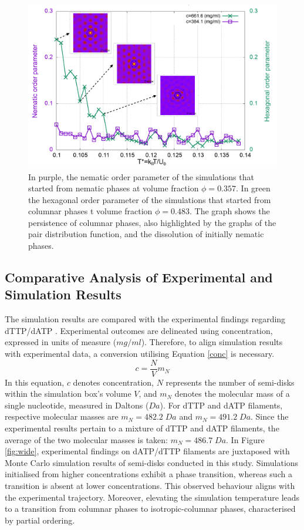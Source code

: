 \documentclass[aip,jcp, amsmath, amssymb, reprint]{revtex4-1}
\begin{document}
\begin{figure}[h!]
\includegraphics[width=0.99\linewidth]{par.png}
\caption{\label{fig:par} In purple, the nematic order parameter of the simulations that started from nematic phases at volume fraction $\phi=0.357$. In green the hexagonal order parameter of the simulations that started from columnar phases t volume fraction $\phi=0.483$. The graph shows the persistence of columnar phases, also highlighted by the graphs of the pair distribution function, and the dissolution of initially nematic phases.}
\end{figure}



\subsection{Comparative Analysis of Experimental and Simulation Results}


The simulation results are compared with the experimental findings regarding dTTP/dATP \cite{Smith}. Experimental outcomes are delineated using concentration, expressed in units of measure ($mg/ml$). Therefore, to align simulation results with experimental data, a conversion utilising Equation \ref{conc} is necessary. 
\begin{equation}
	c=\frac{N}{V}m_N
	\label{conc}
\end{equation}
In this equation, $c$ denotes concentration, $N$ represents the number of semi-disks within the simulation box's volume $V$, and $m_N$ denotes the molecular mass of a single nucleotide, measured in Daltons ($Da$). For dTTP and dATP filaments, respective molecular masses are $m_N=482.2\; Da$ and $m_N=491.2\; Da$. Since the experimental results pertain to a mixture of dTTP and dATP filaments, the average of the two molecular masses is taken: $m_N=486.7\; Da$. In Figure \ref{fig:wide}, experimental findings on dATP/dTTP filaments \cite{Smith} are juxtaposed with Monte Carlo simulation results of semi-disks conducted in this study. Simulations initialised from higher concentrations exhibit a phase transition, whereas such a transition is absent at lower concentrations. This observed behaviour aligns with the experimental trajectory. Moreover, elevating the simulation temperature leads to a transition from columnar phases to isotropic-columnar phases, characterised by partial ordering.
\end{document}
